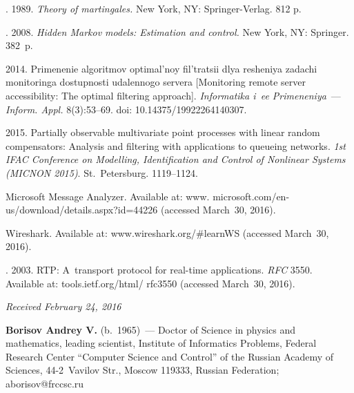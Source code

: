 \begin{multicols}{2}
{{\begin{thebibliography}{99}
. 1989. \textit{Theory of martingales.}
New York, NY: Springer-Verlag. 812 p.

. 2008. \textit{Hidden Markov
models: Estimation and control.} New York, NY: Springer. 382~p.

 2014. Primenenie algoritmov optimal'noy fil'tratsii dlya 
resheniya zadachi monitoringa do\-stup\-nosti udalennogo servera [Monitoring remote 
server accessibility: The optimal filtering approach]. 
\textit{Informatika i~ee Primeneniya}~--- \textit{Inform. Appl.} 8(3):53--69. 
doi: 10.14375/19922264140307.

 2015. Partially observable multivariate point processes with 
linear random compensators: Analysis and filtering with applications to queueing 
networks. \textit{1st IFAC Conference on Modelling, Identification and Control 
of Nonlinear Systems (MICNON 2015)}. St.\ Petersburg. 1119--1124.

Microsoft Message Analyzer. Available at: 
{\sf www. microsoft.com/en-us/download/details.aspx?id=44226} (accessed March~30, 2016).

Wireshark. Available at: {\sf www.wireshark.org/\#learnWS} (accessed March~30, 2016).

. 2003. 
RTP: A~transport protocol for real-time applications. 
\textit{RFC} 3550. Available at: {\sf 
tools.ietf.org/html/ rfc3550} (accessed March~30, 2016).
\end{thebibliography}

 }
 }

\end{multicols}

\vspace*{-3pt}

\hfill{\small\textit{Received February 24, 2016}}


\Contr

\noindent
\textbf{Borisov Andrey V.} (b.\ 1965)~---
Doctor of Science in physics and mathematics, leading scientist, 
Institute of Informatics Problems, Federal Research Center 
``Computer Science and Control'' of the Russian Academy of Sciences,
44-2~Vavilov Str., Moscow 119333, Russian Federation; \mbox{aborisov@frccsc.ru}

\vspace*{3pt}

